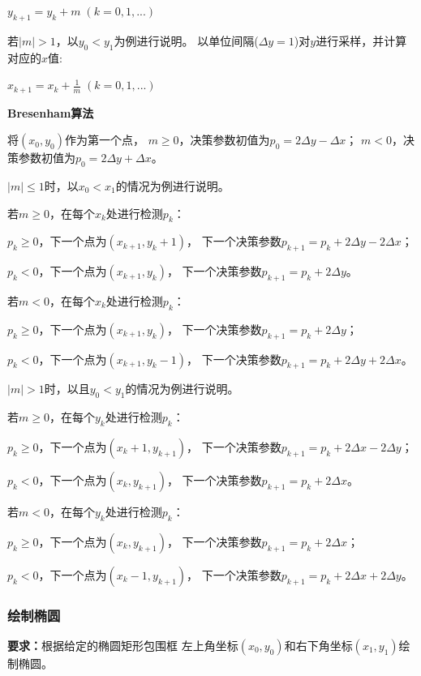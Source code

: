 \documentclass[a4paper,UTF8]{article}
\begin{document}
$y_{k+1}=y_k+m\;(k=0,1,...)$

若$|m|>1$，以$y_0<y_1$为例进行说明。
以单位间隔($\Delta y=1$)对$y$进行采样，并计算对应的$x$值:

$x_{k+1}=x_k+\frac{1}{m}\;(k=0,1,...)$

\textbf{Bresenham算法}

将$(x_0,y_0)$作为第一个点，
$m\geqslant 0$，决策参数初值为$p_0=2\Delta y-\Delta x$；
$m<0$，决策参数初值为$p_0=2\Delta y+\Delta x$。

$|m|\leqslant 1$时，以$x_0<x_1$的情况为例进行说明。

若$m\geqslant 0$，在每个$x_k$处进行检测$p_k$：

\hspace{2em}$p_k\geqslant 0$，下一个点为$(x_{k+1},y_{k}+1)$，
下一个决策参数$p_{k+1}=p_k+2\Delta y-2\Delta x$；

\hspace{2em}$p_k<0$，下一个点为$(x_{k+1},y_k)$，
下一个决策参数$p_{k+1}=p_k+2\Delta y$。

若$m<0$，在每个$x_k$处进行检测$p_k$：

\hspace{2em}$p_k\geqslant 0$，下一个点为$(x_{k+1},y_{k})$，
下一个决策参数$p_{k+1}=p_k+2\Delta y$；

\hspace{2em}$p_k<0$，下一个点为$(x_{k+1},y_{k}-1)$，
下一个决策参数$p_{k+1}=p_k+2\Delta y+2\Delta x$。


$|m|>1$时，以且$y_0<y_1$的情况为例进行说明。

若$m\geqslant 0$，在每个$y_k$处进行检测$p_k$：

\hspace{2em}$p_k\geqslant 0$，下一个点为$(x_{k}+1,y_{k+1})$，
下一个决策参数$p_{k+1}=p_k+2\Delta x-2\Delta y$；

\hspace{2em}$p_k<0$，下一个点为$(x_{k},y_{k+1})$，
下一个决策参数$p_{k+1}=p_k+2\Delta x$。

若$m<0$，在每个$y_k$处进行检测$p_k$：

\hspace{2em}$p_k\geqslant 0$，下一个点为$(x_{k},y_{k+1})$，
下一个决策参数$p_{k+1}=p_k+2\Delta x$；

\hspace{2em}$p_k<0$，下一个点为$(x_{k}-1,y_{k+1})$，
下一个决策参数$p_{k+1}=p_k+2\Delta x+2\Delta y$。


\subsubsection{绘制椭圆}
\textbf{要求：}根据给定的椭圆矩形包围框
左上角坐标$(x_0,y_0)$和右下角坐标$(x_1,y_1)$绘制椭圆。
\end{document}

